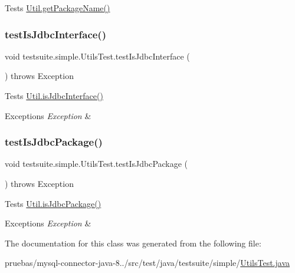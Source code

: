 Tests \mbox{\hyperlink{classcom_1_1mysql_1_1cj_1_1util_1_1_util_a142027940787b4d09dc21ea4c5de617e}{Util.\+get\+Package\+Name()}} \mbox{\label{classtestsuite_1_1simple_1_1_utils_test_a5983623d2b264a98e4d7a3859d1404c7}} 
\subsubsection{\texorpdfstring{test\+Is\+Jdbc\+Interface()}{testIsJdbcInterface()}}
{\footnotesize\ttfamily void testsuite.\+simple.\+Utils\+Test.\+test\+Is\+Jdbc\+Interface (\begin{DoxyParamCaption}{ }\end{DoxyParamCaption}) throws Exception}

Tests \mbox{\hyperlink{classcom_1_1mysql_1_1cj_1_1util_1_1_util_a6c781a9f788160ce358b6237b4a6b0da}{Util.\+is\+Jdbc\+Interface()}}


\begin{DoxyExceptions}{Exceptions}
{\em Exception} & \\
\hline
\end{DoxyExceptions}
\mbox{\label{classtestsuite_1_1simple_1_1_utils_test_acdd7d8143bc1dede650e3c5991d92193}} 
\subsubsection{\texorpdfstring{test\+Is\+Jdbc\+Package()}{testIsJdbcPackage()}}
{\footnotesize\ttfamily void testsuite.\+simple.\+Utils\+Test.\+test\+Is\+Jdbc\+Package (\begin{DoxyParamCaption}{ }\end{DoxyParamCaption}) throws Exception}

Tests \mbox{\hyperlink{classcom_1_1mysql_1_1cj_1_1util_1_1_util_a4ff66f7ccc05ec9631b13bb5e9e9fbbe}{Util.\+is\+Jdbc\+Package()}}


\begin{DoxyExceptions}{Exceptions}
{\em Exception} & \\
\hline
\end{DoxyExceptions}


The documentation for this class was generated from the following file\+:\begin{DoxyCompactItemize}
\item 
pruebas/mysql-\/connector-\/java-\/8../src/test/java/testsuite/simple/\mbox{\hyperlink{_utils_test_8java}{Utils\+Test.\+java}}\end{DoxyCompactItemize}
